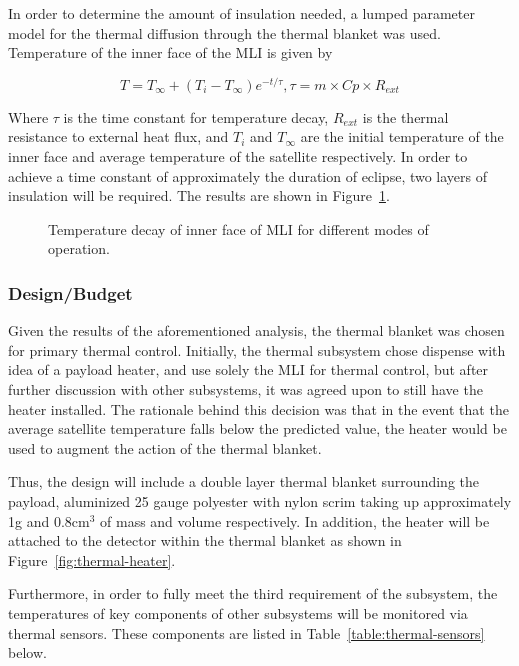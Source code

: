 \documentclass[12pt]{article}
\begin{document}
In order to determine the amount of insulation needed, a lumped parameter model for the thermal diffusion through the thermal blanket was used. Temperature of the inner face of the MLI is given by

\begin{equation}
T = T_\infty + (T_i- T_\infty)e^{-t/\tau}, \tau = m \times Cp \times R_{ext}
\label{eq:thermal-inner-MLI}
\end{equation}

Where $\tau$ is the time constant for temperature decay, $R_{ext}$ is the thermal resistance to external heat flux, and $T_i$ and $T_\infty$ are the initial temperature of the inner face and average temperature of the satellite respectively. In order to achieve a time constant of approximately the duration of eclipse, two layers of insulation will be required. The results are shown in Figure~\ref{fig:thermal-decay}.

\begin{figure}[ht]%
\centering
\caption{Temperature decay of inner face of MLI for different modes of operation.}%
\label{fig:thermal-decay}%
\end{figure}

\subsubsection{Design/Budget}

Given the results of the aforementioned analysis, the thermal blanket was chosen for primary thermal control. Initially, the thermal subsystem chose dispense with idea of a payload heater, and use solely the MLI for thermal control, but after further discussion with other subsystems, it was agreed upon to still have the heater installed. The rationale behind this decision was that in the event that the average satellite temperature falls below the predicted value, the heater would be used to augment the action of the thermal blanket.
 
Thus, the design will include a double layer thermal blanket surrounding the payload, aluminized 25 gauge polyester with nylon scrim taking up approximately 1g and 0.8cm$^3$ of mass and volume respectively. In addition, the heater will be attached to the detector within the thermal blanket as shown in Figure~\ref{fig:thermal-heater}.

Furthermore, in order to fully meet the third requirement of the subsystem, the temperatures of key components of other subsystems will be monitored via thermal sensors.  These components are listed in Table~\ref{table:thermal-sensors} below.
\end{document}
